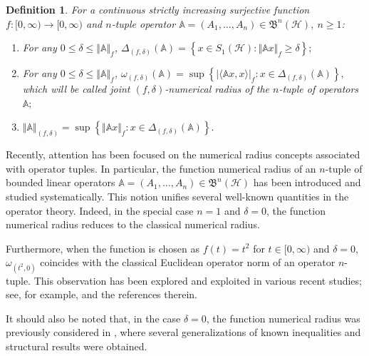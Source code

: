 \documentclass[12pt]{article}
\newtheorem{definition}{Definition}
\begin{document}
\begin{definition}
\label{def6}
For a continuous strictly increasing surjective function $ f:[0,\infty)\rightarrow [0,\infty) $ and $n$-tuple operator
$\mathbb{A} = (A_{1}, \ldots, A_{n}) \in \mathfrak{B}^{n}(\mathcal{H}), \ n\geq 1$:
\begin{enumerate}[label=\upshape{\arabic*.}, ref=\upshape{\arabic*}, labelindent=5pt, leftmargin=*]
\item For any $ 0\leq \delta \leq \Vert \mathbb{A} \Vert_{f}  $,
\(
\Delta_{(f,\delta)}(\mathbb{A})= \left\lbrace x\in S_{1}(\mathcal{H}) : \Vert \mathbb{A}x \Vert_{f}\geq \delta  \right\rbrace ;
\)
\item For any $ 0\leq \delta \leq \Vert \mathbb{A} \Vert_{f}  $,
\(
\omega_{(f,\delta )}(\mathbb{A})= \sup\left\lbrace \vert \langle \mathbb{A}x,x \rangle \vert_{f} : x\in \Delta_{(f,\delta)}(\mathbb{A})\right\rbrace ,
\)
which will be called joint $(f,\delta)$-numerical radius of the $n$-tuple of operators $ \mathbb{A};$
\item $ \Vert \mathbb{A} \Vert_{(f,\delta)}= \sup\left\lbrace \Vert \mathbb{A}x \Vert_{f}  : x\in \Delta_{(f,\delta)}(\mathbb{A})\right\rbrace . $
\end{enumerate}
\end{definition}

Recently, attention has been focused on the numerical radius concepts associated with operator tuples. In particular, the function numerical radius of an $n$-tuple of bounded linear operators $\mathbb{A}=(A_{1},\dots,A_{n})\in\mathfrak{B}^{n}(\mathcal{H})$ has been introduced and studied systematically. This notion unifies several well-known quantities in the operator theory. Indeed, in the special case $n=1$ and $\delta=0$, the function numerical radius reduces to the classical numerical radius.

Furthermore, when the function is chosen as $f(t)=t^{2}$ for $t\in[0,\infty)$ and $\delta=0$, $ \omega_{(t^{2},0)} $ coincides with the classical Euclidean operator norm of an operator $n$-tuple. This observation has been explored and exploited in various recent studies; see, for example, \cite{Drnovsek2014, Feki2024, FekiYamazaki2021, Gau2021, Guesba2024, Guesba2025,  Jana2024, Mal2023, Muller2020, WangWang2025} and the references therein.

It should also be noted that, in the case $\delta=0$, the function numerical radius was previously considered in \cite{Alomari2024}, where several generalizations of known inequalities and structural results were obtained.
\end{document}
